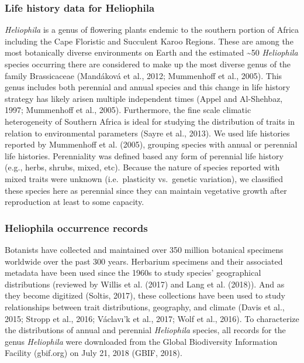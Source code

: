 \documentclass[man,floatsintext]{apa6}
\theoremstyle{definition}
\theoremstyle{definition}
\theoremstyle{definition}
\theoremstyle{remark}
\begin{document}
\hypertarget{life-history-data-for-heliophila}{%
\subsubsection{Life history data for
Heliophila}\label{life-history-data-for-heliophila}}

\emph{Heliophila} is a genus of flowering plants endemic to the southern
portion of Africa including the Cape Floristic and Succulent Karoo
Regions. These are among the most botanically diverse environments on
Earth and the estimated \textasciitilde{}50 \emph{Heliophila} species
occurring there are considered to make up the most diverse genus of the
family Brassicaceae (Mandáková et al., 2012; Mummenhoff et al., 2005).
This genus includes both perennial and annual species and this change in
life history strategy has likely arisen multiple independent times
(Appel and Al-Shehbaz, 1997; Mummenhoff et al., 2005). Furthermore, the
fine scale climatic heterogeneity of Southern Africa is ideal for
studying the distribution of traits in relation to environmental
parameters (Sayre et al., 2013). We used life histories reported by
Mummenhoff et al. (2005), grouping species with annual or perennial life
histories. Perenniality was defined based any form of perennial life
history (e.g., herbs, shrubs, mixed, etc). Because the nature of species
reported with mixed traits were unknown (i.e.~plasticity vs.~genetic
variation), we classified these species here as perennial since they can
maintain vegetative growth after reproduction at least to some capacity.

\hypertarget{heliophila-occurrence-records}{%
\subsubsection{Heliophila occurrence
records}\label{heliophila-occurrence-records}}

Botanists have collected and maintained over 350 million botanical
specimens worldwide over the past 300 years. Herbarium specimens and
their associated metadata have been used since the 1960s to study
species' geographical distributions (reviewed by Willis et al. (2017)
and Lang et al. (2018)). And as they become digitized (Soltis, 2017),
these collections have been used to study relationships between trait
distributions, geography, and climate (Davis et al., 2015; Stropp et
al., 2016; Václavı'k et al., 2017; Wolf et al., 2016). To characterize
the distributions of annual and perennial \emph{Heliophila} species, all
records for the genus \emph{Heliophila} were downloaded from the Global
Biodiversity Information Facility (gbif.org) on July 21, 2018 (GBIF,
2018).
\end{document}
